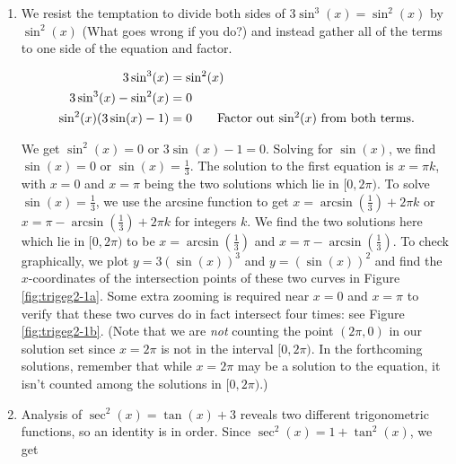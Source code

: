 {
\begin{enumerate}

\item We resist the temptation to divide both sides of $3\sin^{3}(x) = \sin^{2}(x)$ by $\sin^{2}(x)$ (What goes wrong if you do?) and instead gather all of the terms to one side of the equation and factor.

\begin{align*}
3\sin^{3}(x) & =   \sin^{2}(x) \\
3\sin^{3}(x) -  \sin^{2}(x) & =  0   \\
\sin^{2}(x) (3 \sin(x) - 1) & =  0  \tag*{Factor out $\sin^{2}(x)$ from both terms.}
\end{align*}

We get $\sin^{2}(x) = 0$ or $3\sin(x) - 1 = 0$. Solving for $\sin(x)$, we find  $\sin(x) = 0$ or $\sin(x) = \frac{1}{3}$.  The solution to the first equation is $x = \pi k$, with $x = 0$ and $x = \pi$ being the two solutions which lie in $[0,2\pi)$.  To solve $\sin(x) = \frac{1}{3}$, we use the arcsine function to get $x = \arcsin\left(\frac{1}{3}\right) + 2\pi k$ or $x = \pi - \arcsin\left(\frac{1}{3}\right) + 2\pi k$ for integers $k$. We find the two solutions here which lie in $[0,2\pi)$ to be $x = \arcsin\left(\frac{1}{3}\right)$ and $x = \pi - \arcsin\left(\frac{1}{3}\right)$.  To check graphically, we plot $y = 3(\sin(x))^3$ and $y = (\sin(x))^2$ and find the  $x$-coordinates of the intersection points of these two curves in Figure \ref{fig:trigeg2-1a}.  Some extra zooming is required near $x=0$ and $x=\pi$ to verify that these two curves do in fact intersect four times: see Figure \ref{fig:trigeg2-1b}. (Note that we are \textit{not} counting the point $(2\pi,0)$ in our solution set since $x = 2\pi$ is not in the interval $[0,2\pi)$. In the forthcoming solutions, remember that while  $x = 2\pi$ may be a solution to the equation, it isn't counted among the solutions in $[0,2\pi)$.)




\item  Analysis of  $\sec^{2}(x) = \tan(x) + 3$ reveals two different trigonometric functions, so an identity is in order.  Since $\sec^{2}(x) = 1 + \tan^{2}(x)$, we get


\end{enumerate}}
